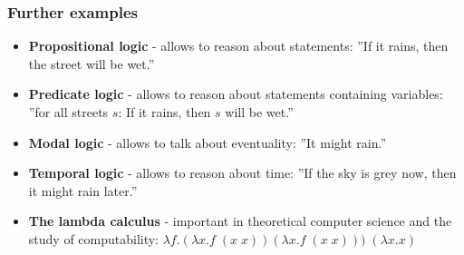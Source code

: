   
\begin{frame}
  \frametitle{Further examples}
  \begin{itemize}
    \item \textbf{Propositional logic} - allows to reason about statements: ''If it rains, then the street will be wet.''
    \pause \item \textbf{Predicate logic} - allows to reason about statements containing variables: ''for all streets $s$: If it rains, then $s$ will be wet.'' 
    \pause \item \textbf{Modal logic} - allows to talk about eventuality: ''It might rain.''
    \pause \item \textbf{Temporal logic} - allows to reason about time: ''If the sky is grey now, then it might rain later.''
    \pause \item \textbf{The lambda calculus} - important in theoretical computer science and the study of computability: $\lambda f.(\lambda x. f\;(x\; x)) (\lambda x. f\;(x\; x)))\; (\lambda x. x)$
  \end{itemize}
\end{frame}


